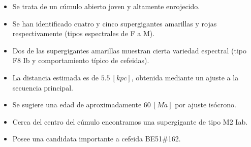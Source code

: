 \documentclass[a4paper,fleqn,usenatbib]{mnras}
\begin{document}
\begin{itemize}
  \item Se trata de un cúmulo abierto joven y altamente enrojecido. 
  \item Se han identificado cuatro y cinco supergigantes amarillas y rojas respectivamente (tipos espectrales de F a M).
  \item Dos de las supergigantes amarillas muestran cierta variedad espectral (tipo F8 Ib y comportamiento típico de cefeidas).
  \item La distancia estimada es de $5.5~[kpc]$, obtenida mediante un ajuste a la secuencia principal.
  \item Se sugiere una edad de aproximadamente $60~[Ma]$ por ajuste isócrono.
  \item Cerca del centro del cúmulo encontramos una supergigante de tipo M2 Iab.
  \item Posee una candidata importante a cefeida BE51\#162.
\end{itemize}
\end{document}

